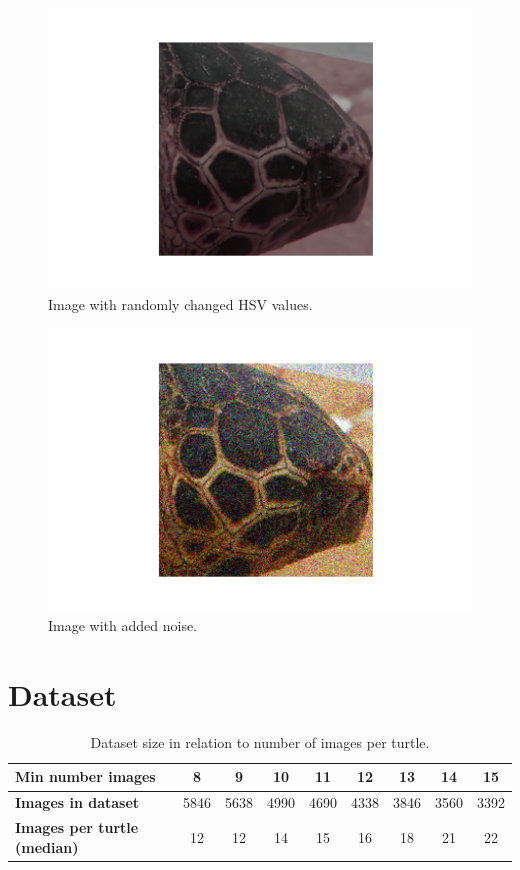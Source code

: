 \begin{figure}[h]
    \centering
    \includegraphics{images/turtles/hsv.png}
    \caption{Image with randomly changed HSV values.}
    \label{fig:turtleHSV}
\end{figure}

\begin{figure}[h]
    \centering
    \includegraphics{images/turtles/noise.png}
    \caption{Image with added noise.}
    \label{fig:turtleNoise}
\end{figure}

\clearpage

\section{Dataset}\label{apx:minImages}
\begin{table}[h]
    \begin{tabular}{|l|c|c|c|c|c|c|c|c|}
    \hline
    \textbf{Min number images}                 & 8    & 9    & 10   & 11   & 12   & 13   & 14   & 15   \\ \hline
    \textbf{Images in dataset}               & 5846 & 5638 & 4990 & 4690 & 4338 & 3846 & 3560 & 3392 \\ \hline
    \textbf{Images per turtle (median)} & 12   & 12   & 14   & 15   & 16   & 18   & 21   & 22   \\ \hline
    \end{tabular}
    \caption[]{Dataset size in relation to number of images per turtle.}
    \label{tab:minImages}
\end{table}